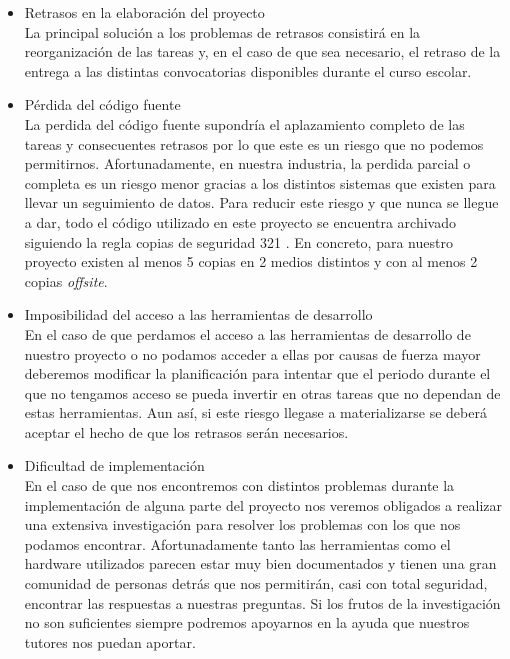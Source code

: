 \begin{itemize}
    \item Retrasos en la elaboración del proyecto\\
        La principal solución a los problemas de retrasos consistirá en la reorganización de las tareas y, en el caso de que sea necesario, el retraso de la entrega a las distintas convocatorias disponibles durante el curso escolar.

    \item Pérdida del código fuente\\
        La perdida del código fuente supondría el aplazamiento completo de las tareas y consecuentes retrasos por lo que este es un riesgo que no podemos permitirnos. Afortunadamente, en nuestra industria, la perdida parcial o completa es un riesgo menor gracias a los distintos sistemas que existen para llevar un seguimiento de datos. Para reducir este riesgo y que nunca se llegue a dar, todo el código utilizado en este proyecto se encuentra archivado siguiendo la regla copias de seguridad 321 \cite{backups321}. En concreto, para nuestro proyecto existen al menos 5 copias en 2 medios distintos y con al menos 2 copias \textit{offsite}.

    \item Imposibilidad del acceso a las herramientas de desarrollo\\
        En el caso de que perdamos el acceso a las herramientas de desarrollo de nuestro proyecto o no podamos acceder a ellas por causas de fuerza mayor deberemos modificar la planificación para intentar que el periodo durante el que no tengamos acceso se pueda invertir en otras tareas que no dependan de estas herramientas. Aun así, si este riesgo llegase a materializarse se deberá aceptar el hecho de que los retrasos serán necesarios.
            
    \item Dificultad de implementación\\
        En el caso de que nos encontremos con distintos problemas durante la implementación de alguna parte del proyecto nos veremos obligados a realizar una extensiva investigación para resolver los problemas con los que nos podamos encontrar. Afortunadamente tanto las herramientas como el hardware utilizados parecen estar muy bien documentados y tienen una gran comunidad de personas detrás que nos permitirán, casi con total seguridad, encontrar las respuestas a nuestras preguntas. Si los frutos de la investigación no son suficientes siempre podremos apoyarnos en la ayuda que nuestros tutores nos puedan aportar.

\end{itemize}